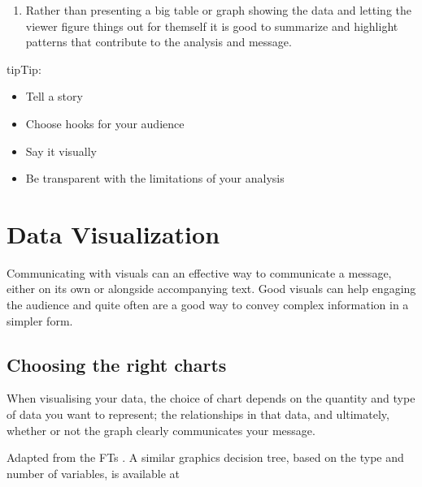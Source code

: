 \documentclass[letterpaper,10pt,english]{jupyterBook}
\begin{document}
\begin{enumerate}
\item {} 
\sphinxAtStartPar
{} Rather than presenting a big table or graph showing the data and letting the viewer figure things out for themself it is good to summarize and highlight patterns that contribute to the analysis and message.

\end{enumerate}

\begin{sphinxadmonition}{tip}{Tip:}\begin{itemize}
\item {} 
\sphinxAtStartPar
Tell a story

\item {} 
\sphinxAtStartPar
Choose hooks for your audience

\item {} 
\sphinxAtStartPar
Say it visually

\item {} 
\sphinxAtStartPar
Be transparent with the limitations of your analysis

\end{itemize}
\end{sphinxadmonition}


\section{Data Visualization}
\label{\detokenize{part1/communication:data-visualization}}
\sphinxAtStartPar
Communicating with visuals can an effective way to communicate a message, either on its own or alongside accompanying text. Good visuals can help engaging the audience and quite often are a good way to convey complex information in a simpler form.


\subsection{Choosing the right charts}
\label{\detokenize{part1/communication:choosing-the-right-charts}}
\sphinxAtStartPar
When visualising your data, the choice of chart depends on the quantity and type of data you want to represent; the relationships in that data, and ultimately, whether or not the graph clearly communicates your message.%
\begin{footnote}[2]\sphinxAtStartFootnote
Adapted from the FTs . A similar graphics decision tree, based on the type and number of variables, is available at 
%
\end{footnote}
\end{document}
